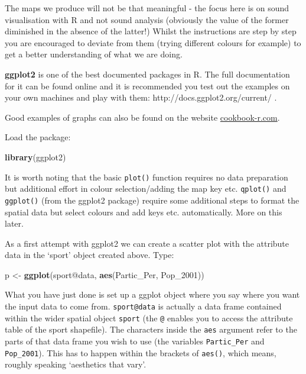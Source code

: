 \documentclass[]{article}
\newenvironment{Shaded}{}{}
\newcommand{\KeywordTok}[1]{\textcolor[rgb]{0.00,0.44,0.13}{\textbf{{#1}}}}
\newcommand{\StringTok}[1]{\textcolor[rgb]{0.25,0.44,0.63}{{#1}}}
\newcommand{\NormalTok}[1]{{#1}}
\begin{document}
The maps we produce will not be that meaningful - the focus here is on
sound visualisation with R and not sound analysis (obviously the value
of the former diminished in the absence of the latter!) Whilst the
instructions are step by step you are encouraged to deviate from them
(trying different colours for example) to get a better understanding of
what we are doing.

\textbf{ggplot2} is one of the best documented packages in R. The full
documentation for it can be found online and it is recommended you test
out the examples on your own machines and play with them:
http://docs.ggplot2.org/current/ .

Good examples of graphs can also be found on the website
\href{http://www.cookbook-r.com/Graphs/}{cookbook-r.com}.

Load the package:

\begin{Shaded}
\begin{Highlighting}[]
\KeywordTok{library}\NormalTok{(ggplot2)}
\end{Highlighting}
\end{Shaded}

It is worth noting that the basic \texttt{plot()} function requires no
data preparation but additional effort in colour selection/adding the
map key etc. \texttt{qplot()} and \texttt{ggplot()} (from the ggplot2
package) require some additional steps to format the spatial data but
select colours and add keys etc. automatically. More on this later.

As a first attempt with ggplot2 we can create a scatter plot with the
attribute data in the `sport' object created above. Type:

\begin{Shaded}
\begin{Highlighting}[]
\NormalTok{p <-}\StringTok{ }\KeywordTok{ggplot}\NormalTok{(sport@data, }\KeywordTok{aes}\NormalTok{(Partic_Per, Pop_2001))}
\end{Highlighting}
\end{Shaded}

What you have just done is set up a ggplot object where you say where
you want the input data to come from. \texttt{sport@data} is actually a
data frame contained within the wider spatial object \texttt{sport} (the
\texttt{@} enables you to access the attribute table of the sport
shapefile). The characters inside the \texttt{aes} argument refer to the
parts of that data frame you wish to use (the variables
\texttt{Partic\_Per} and \texttt{Pop\_2001}). This has to happen within
the brackets of \texttt{aes()}, which means, roughly speaking
`aesthetics that vary'.
\end{document}
